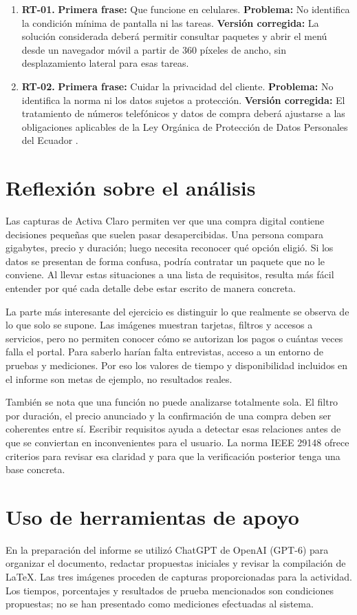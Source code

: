 \documentclass[12pt,a4paper]{article}
\begin{document}
\begin{enumerate}[leftmargin=*,itemsep=7pt]
\item \textbf{RT-01.} \textbf{Primera frase:} Que funcione en celulares. \textbf{Problema:} No identifica la condición mínima de pantalla ni las tareas. \textbf{Versión corregida:} La solución considerada deberá permitir consultar paquetes y abrir el menú desde un navegador móvil a partir de 360 píxeles de ancho, sin desplazamiento lateral para esas tareas.

\item \textbf{RT-02.} \textbf{Primera frase:} Cuidar la privacidad del cliente. \textbf{Problema:} No identifica la norma ni los datos sujetos a protección. \textbf{Versión corregida:} El tratamiento de números telefónicos y datos de compra deberá ajustarse a las obligaciones aplicables de la Ley Orgánica de Protección de Datos Personales del Ecuador \cite{leyDatos}.
\end{enumerate}
\section{Reflexión sobre el análisis}
Las capturas de Activa Claro permiten ver que una compra digital contiene decisiones pequeñas que suelen pasar desapercibidas. Una persona compara gigabytes, precio y duración; luego necesita reconocer qué opción eligió. Si los datos se presentan de forma confusa, podría contratar un paquete que no le conviene. Al llevar estas situaciones a una lista de requisitos, resulta más fácil entender por qué cada detalle debe estar escrito de manera concreta.

La parte más interesante del ejercicio es distinguir lo que realmente se observa de lo que solo se supone. Las imágenes muestran tarjetas, filtros y accesos a servicios, pero no permiten conocer cómo se autorizan los pagos o cuántas veces falla el portal. Para saberlo harían falta entrevistas, acceso a un entorno de pruebas y mediciones. Por eso los valores de tiempo y disponibilidad incluidos en el informe son metas de ejemplo, no resultados reales.

También se nota que una función no puede analizarse totalmente sola. El filtro por duración, el precio anunciado y la confirmación de una compra deben ser coherentes entre sí. Escribir requisitos ayuda a detectar esas relaciones antes de que se conviertan en inconvenientes para el usuario. La norma IEEE 29148 ofrece criterios para revisar esa claridad y para que la verificación posterior tenga una base concreta.

\section{Uso de herramientas de apoyo}
En la preparación del informe se utilizó ChatGPT de OpenAI (GPT-6) para organizar el documento, redactar propuestas iniciales y revisar la compilación de LaTeX. Las tres imágenes proceden de capturas proporcionadas para la actividad. Los tiempos, porcentajes y resultados de prueba mencionados son condiciones propuestas; no se han presentado como mediciones efectuadas al sistema.

\printbibliography[heading=bibintoc,title={Referencias bibliográficas}]
\end{document}
